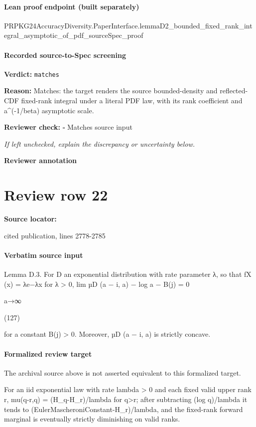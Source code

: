 \documentclass[10pt]{article}
\newcommand{\reviewerbox}{%
  \par\noindent\fbox{\parbox{0.96\linewidth}{\rule{0pt}{0.38in}}}\par
}
\newcommand{\reviewmatch}[1]{%
  \par\noindent\textbf{Reviewer check:} $\square$\; #1\par
  \noindent\emph{If left unchecked, explain the discrepancy or uncertainty below.}\par
}
\begin{document}
\paragraph{Lean proof endpoint (built separately)}\begin{ReviewVerbatim}
PRPKG24AccuracyDiversity.PaperInterface.lemmaD2_bounded_fixed_rank_integral_asymptotic_of_pdf_sourceSpec_proof
\end{ReviewVerbatim}

\paragraph{Recorded source-to-Spec screening}
\textbf{Verdict:} \texttt{matches}
\\
{\raggedright
\textbf{Reason:} Matches:\allowbreak{} the target renders the source bounded-\allowbreak{}density and reflected-\allowbreak{}CDF fixed-\allowbreak{}rank integral under a literal PDF law, with its rank coefficient and a\textasciicircum{}(-\allowbreak{}1/\allowbreak{}beta) asymptotic scale.\allowbreak{}
\par}
\reviewmatch{Matches source input}
\noindent\textbf{Reviewer annotation}\par
\reviewerbox
\clearpage
\hypertarget{source-claim-dcffa0731fd7e8dc}{}
\section*{Review row 22}
\textbf{Source locator:} {\footnotesize\raggedright cited publication, lines 2778-\allowbreak{}2785\par}
\paragraph{Verbatim source input}
\begin{ReviewVerbatim}
Lemma D.3. For D an exponential distribution with rate parameter λ, so that fX (x) = λe−λx for λ > 0,
lim µD (a − i, a) − log a − B(j) = 0

a→∞

(127)

for a constant B(j) > 0. Moreover, µD (a − i, a) is strictly concave.
\end{ReviewVerbatim}


\paragraph{Formalized review target}
The archival source above is not asserted equivalent to this formalized target.
\begin{ReviewVerbatim}
For an iid exponential law with rate lambda > 0 and each fixed valid upper rank r, mu(q-r,q) = (H_q-H_r)/lambda for q>r; after subtracting (log q)/lambda it tends to (EulerMascheroniConstant-H_r)/lambda, and the fixed-rank forward marginal is eventually strictly diminishing on valid ranks.
\end{ReviewVerbatim}
\end{document}
